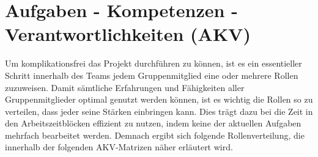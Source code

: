 \chapter{Aufgaben - Kompetenzen - Verantwortlichkeiten (AKV)}\label{ch:AKV}
Um komplikationsfrei das Projekt durchführen zu können, ist es ein essentieller Schritt innerhalb
des Teams jedem Gruppenmitglied eine oder mehrere Rollen zuzuweisen.
Damit sämtliche Erfahrungen und Fähigkeiten aller Gruppenmitglieder optimal genutzt werden können, 
ist es wichtig die Rollen so zu verteilen, dass jeder seine Stärken einbringen kann. 
Dies trägt dazu bei die Zeit in den Arbeitszeitblöcken effizient zu nutzen, indem keine der aktuellen Aufgaben
mehrfach bearbeitet werden. 
Demnach ergibt sich folgende Rollenverteilung, die innerhalb der folgenden AKV-Matrizen näher erläutert wird.

